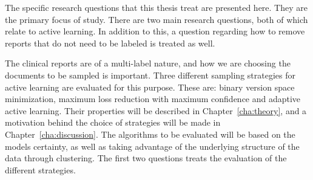The specific research questions that this thesis treat are presented here.
They are the primary focus of study.
There are two main research questions, both of which relate to active learning.
In addition to this, a question regarding how to remove reports that do not need to be labeled is treated as well.

The clinical reports are of a multi-label nature, and how we are choosing the documents to be sampled is important.
Three different sampling strategies for active learning are evaluated for this purpose.
These are: binary version space minimization, maximum loss reduction with maximum confidence and adaptive active learning.
Their properties will be described in Chapter~\ref{cha:theory}, and a motivation behind the choice of strategies will be made in Chapter~\ref{cha:discussion}.
The algorithms to be evaluated will be based on the models certainty, as well as taking advantage of the underlying structure of the data through clustering.
The first two questions treats the evaluation of the different strategies.


